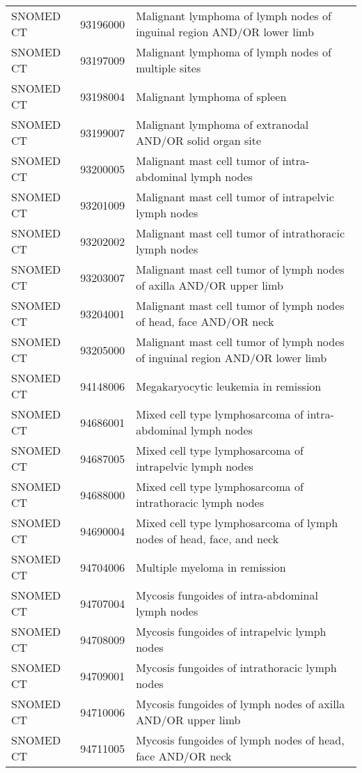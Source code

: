 \begin{table}[ht]
\begin{tabular}{lll}
  SNOMED CT & 93196000 & Malignant lymphoma of lymph nodes of inguinal region AND/OR lower limb \\ 
  SNOMED CT & 93197009 & Malignant lymphoma of lymph nodes of multiple sites \\ 
  SNOMED CT & 93198004 & Malignant lymphoma of spleen \\ 
  SNOMED CT & 93199007 & Malignant lymphoma of extranodal AND/OR solid organ site \\ 
  SNOMED CT & 93200005 & Malignant mast cell tumor of intra-abdominal lymph nodes \\ 
  SNOMED CT & 93201009 & Malignant mast cell tumor of intrapelvic lymph nodes \\ 
  SNOMED CT & 93202002 & Malignant mast cell tumor of intrathoracic lymph nodes \\ 
  SNOMED CT & 93203007 & Malignant mast cell tumor of lymph nodes of axilla AND/OR upper limb \\ 
  SNOMED CT & 93204001 & Malignant mast cell tumor of lymph nodes of head, face AND/OR neck \\ 
  SNOMED CT & 93205000 & Malignant mast cell tumor of lymph nodes of inguinal region AND/OR lower limb \\ 
  SNOMED CT & 94148006 & Megakaryocytic leukemia in remission \\ 
  SNOMED CT & 94686001 & Mixed cell type lymphosarcoma of intra-abdominal lymph nodes \\ 
  SNOMED CT & 94687005 & Mixed cell type lymphosarcoma of intrapelvic lymph nodes \\ 
  SNOMED CT & 94688000 & Mixed cell type lymphosarcoma of intrathoracic lymph nodes \\ 
  SNOMED CT & 94690004 & Mixed cell type lymphosarcoma of lymph nodes of head, face, and neck \\ 
  SNOMED CT & 94704006 & Multiple myeloma in remission \\ 
  SNOMED CT & 94707004 & Mycosis fungoides of intra-abdominal lymph nodes \\ 
  SNOMED CT & 94708009 & Mycosis fungoides of intrapelvic lymph nodes \\ 
  SNOMED CT & 94709001 & Mycosis fungoides of intrathoracic lymph nodes \\ 
  SNOMED CT & 94710006 & Mycosis fungoides of lymph nodes of axilla AND/OR upper limb \\ 
  SNOMED CT & 94711005 & Mycosis fungoides of lymph nodes of head, face AND/OR neck \\ 

\end{tabular}
\end{table}
